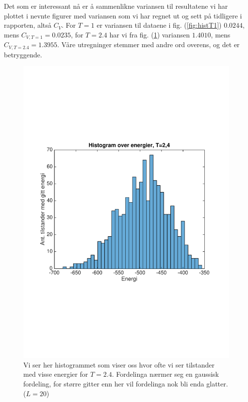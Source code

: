 \documentclass[norsk, 10pt]{article}
\begin{document}
Det som er interessant nå er å sammenlikne variansen til resultatene vi har plottet i nevnte figurer med variansen som vi har regnet ut og sett på tidligere i rapporten, altså $C_V$. For $T=1$ er variansen til dataene i fig. (\ref{fig:histT1}) $0.0244$, mens $C_{V,T=1}=0.0235$, for $T=2.4$ har vi fra fig. (\ref{fig:histT24}) variansen $1.4010$, mens $C_{V,T=2.4} = 1.3955$. Våre utregninger stemmer med andre ord overens, og det er betryggende.

\begin{figure}[H]
	\centering
	\includegraphics[scale = 0.5, trim = 1cm 8cm 1cm 8cm]{histogram_T24_L20.pdf}
	\caption{Vi ser her histogrammet som viser oss hvor ofte vi ser tilstander med visse energier for $T=2.4$. Fordelinga nærmer seg en gaussisk fordeling, for større gitter enn her vil fordelinga nok bli enda glatter.($L=20$)}
	\label{fig:histT24}
\end{figure}
\end{document}
